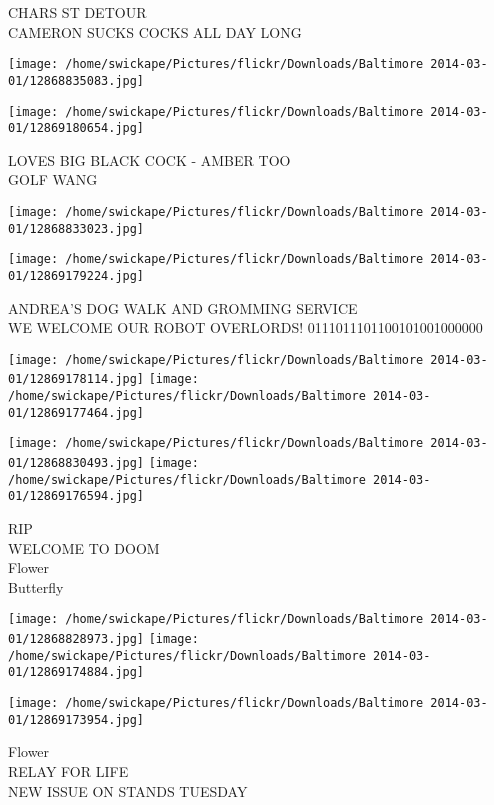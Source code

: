 \documentclass[10pt,letterpaper]{article}
\begin{document}
CHARS ST DETOUR\\
CAMERON SUCKS COCKS ALL DAY LONG
\pagebreak

\texttt{[image: /home/swickape/Pictures/flickr/Downloads/Baltimore 2014-03-01/12868835083.jpg]}

\vspace{0.25in}
\texttt{[image: /home/swickape/Pictures/flickr/Downloads/Baltimore 2014-03-01/12869180654.jpg]}

LOVES BIG BLACK COCK {-} AMBER TOO\\
GOLF WANG
\pagebreak

\texttt{[image: /home/swickape/Pictures/flickr/Downloads/Baltimore 2014-03-01/12868833023.jpg]}

\vspace{0.25in}
\texttt{[image: /home/swickape/Pictures/flickr/Downloads/Baltimore 2014-03-01/12869179224.jpg]}

ANDREA'S DOG WALK AND GROMMING SERVICE\\
WE WELCOME OUR ROBOT OVERLORDS!  0111011101100101001000000
\pagebreak

\texttt{[image: /home/swickape/Pictures/flickr/Downloads/Baltimore 2014-03-01/12869178114.jpg]}
\texttt{[image: /home/swickape/Pictures/flickr/Downloads/Baltimore 2014-03-01/12869177464.jpg]}

\texttt{[image: /home/swickape/Pictures/flickr/Downloads/Baltimore 2014-03-01/12868830493.jpg]}
\texttt{[image: /home/swickape/Pictures/flickr/Downloads/Baltimore 2014-03-01/12869176594.jpg]}

RIP\\
WELCOME TO DOOM\\
Flower\\
Butterfly
\pagebreak

\texttt{[image: /home/swickape/Pictures/flickr/Downloads/Baltimore 2014-03-01/12868828973.jpg]}
\texttt{[image: /home/swickape/Pictures/flickr/Downloads/Baltimore 2014-03-01/12869174884.jpg]}

\texttt{[image: /home/swickape/Pictures/flickr/Downloads/Baltimore 2014-03-01/12869173954.jpg]}

Flower\\
RELAY FOR LIFE\\
NEW ISSUE ON STANDS TUESDAY
\pagebreak
\end{document}
